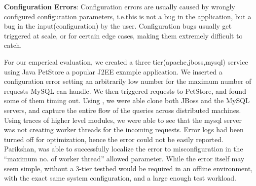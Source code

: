 \noindent
\textbf{Configuration Errors}:
Configuration errors are usually caused by wrongly configured configuration parameters, i.e.this is not a bug in the application, but a bug in the input(configuration) by the user.
Configuration bugs usually get triggered at scale, or for certain edge cases, making them extremely difficult to catch.

For our emperical evaluation, we created a three tier(apache,jboss,mysql) service using Java PetStore a popular J2EE example application.
We inserted a configuration error setting an arbitrarily low number for the maximum number of requests MySQL can handle.
We then triggered requests to PetStore, and found some of them timing out.
Using \parikshan, we were able clone both JBoss and the MySQL servers, and capture the entire flow of the queries across distributed machines.
Using traces of higher level modules, we were able to see that the mysql server was not creating worker threads for the incoming requests.
Error logs had been turned off for optimization, hence the error could not be easily reported. 
Parikshan, was able to successfully localize the error to misconfiguration in the ``maximum no. of worker thread'' allowed parameter.
While the error itself may seem simple, without \parikshan a 3-tier testbed would be required in an offline environment, with the exact same system configuration, and a large enough test workload.






